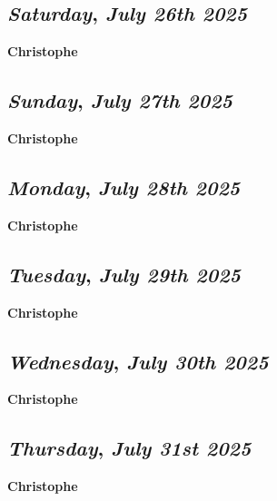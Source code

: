 \def\day{\textit{July 26th 2025}}
\def\weekday{\textit{Saturday}}
\subsection*{\weekday, \day}
\textbf {Christophe}

\def\day{\textit{July 27th 2025}}
\def\weekday{\textit{Sunday}}
\subsection*{\weekday, \day}
\textbf {Christophe}

\def\day{\textit{July 28th 2025}}
\def\weekday{\textit{Monday}}
\subsection*{\weekday, \day}
\textbf {Christophe}

\def\day{\textit{July 29th 2025}}
\def\weekday{\textit{Tuesday}}
\subsection*{\weekday, \day}
\textbf {Christophe}

\def\day{\textit{July 30th 2025}}
\def\weekday{\textit{Wednesday}}
\subsection*{\weekday, \day}
\textbf {Christophe}

\def\day{\textit{July 31st 2025}}
\def\weekday{\textit{Thursday}}
\subsection*{\weekday, \day}
\textbf {Christophe}
